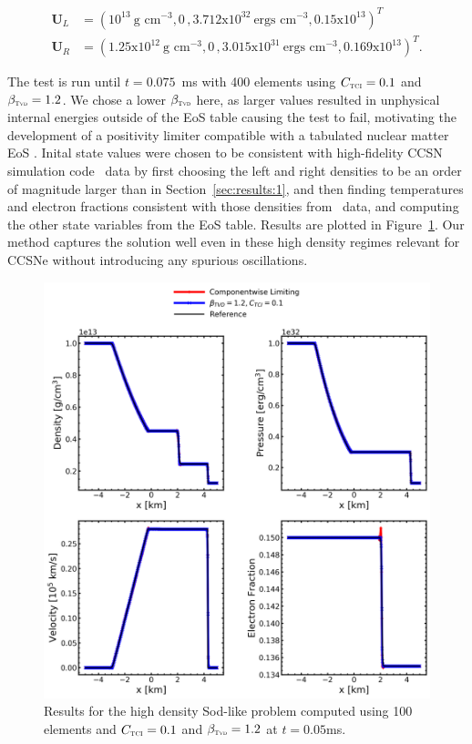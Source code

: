 \documentclass[onecolumn]{aastex62}
\newcommand{\TVD}{\textnormal{\tiny\textsc{Tvd}}}
\newcommand{\TCI}{\textnormal{\tiny\textsc{TCI}}}
\begin{document}
\begin{align*}
  \mathbf{U}_{L} &= (10^{13}~\text{g~cm}^{-3}, 0\,, 3.712\text{x}10^{32}~\text{ergs~cm}^{-3}, 0.15\text{x}10^{13})^T\,\,\, \\
  \mathbf{U}_{R} &= (1.25\text{x}10^{12}~\text{g~cm}^{-3}, 0\, , 3.015\text{x}10^{31}~\text{ergs~cm}^{-3}, 0.169\text{x}10^{13})^T.
\end{align*}

\noindent The test is run until $t = 0.075$~ms with 400 elements
using $C_{\TCI} = 0.1$ and $\beta_{\TVD} = 1.2$. We chose a lower $\beta_{\TVD}$
here, as larger values resulted in unphysical internal energies outside of the
EoS table causing the test to fail, motivating the development of a
positivity limiter compatible with a tabulated nuclear matter EoS \citep{zhang:2010a}.
Inital state values were chosen to be consistent with
high-fidelity CCSN simulation code \chimera\, \citep{bruenn:2018} data by first
choosing the left and right densities to be an order of magnitude larger than in
Section~\ref{sec:results:1}, and then finding temperatures and electron fractions
consistent with those densities from \chimera\, data, and computing the other
state variables from the EoS table.
Results are plotted in
Figure~\ref{fig:SodSedovHighDens}. Our method captures the solution well even 
in these high density regimes relevant for CCSNe without introducing 
any spurious oscillations.

\begin{figure}[h!]
  \centering
  \includegraphics[width=32pc]{./figures/highDens.png}
  \caption{\label{fig:SodSedovHighDens} Results for the high density Sod-like problem
  computed using 100 elements and $C_{\TCI} = 0.1$ and $\beta_{\TVD} = 1.2$ at $t=0.05$ms.}
\end{figure}
\FloatBarrier
\end{document}
